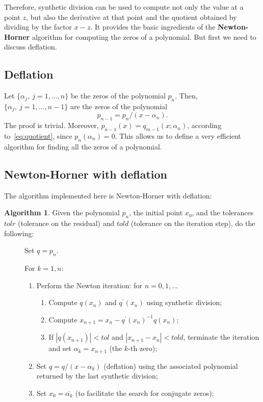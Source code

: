 \documentclass[10pt,a4paper]{article}
\theoremstyle{definition}%
\newtheorem{algo}{Algorithm}
\begin{document}
Therefore, synthetic division can be used to compute not only the value at a point $z$, but also the derivative at that point and the quotient obtained by dividing by the factor $x-z$. It provides the basic ingredients of the \textbf{Newton-Horner} algorithm for computing the zeros of a polynomial. But first we need to discuss deflation.
\subsection{Deflation}
Let $\{\alpha_j,\ j=1,\ldots,n\}$ be the zeros of the polynomial $p_n$. Then, $\{\alpha_j,\ j=1,\ldots,n-1\}$ are the zeros of 
the polynomial
\begin{equation}
p_{n-1}=p_n/(x-\alpha_n).
\end{equation} 
The proof is trivial.
Moreover, $p_{n-1}(x)=q_{m-1}(x;\alpha_n)$, according to~\eqref{eq:quotient}, since $p_n(\alpha_n)=0$. This allows us to define a very efficient algorithm for 
finding all the zeros of a polynomial.
\subsection{Newton-Horner with deflation}
The algorithm implemented here is Newton-Horner with deflation:

\begin{algo}
    Given the polynomial $p_n$, the initial point $x_0$, and the tolerances $tolr$ (tolerance on the residual) and $told$
    (tolerance on the iteration step),
    do the following:
    \begin{description}
        \item[] Set $q=p_n$.
        \item[] For $k=1,n$:
        \begin{enumerate}
            \item Perform the Newton iteration: for $n=0,1,\ldots$
            \begin{enumerate}
                \item Compute $q(x_n)$ and $q^\prime(x_n)$ using synthetic division;
                \item Compute $x_{n+1}=x_{n}-q^\prime(x_{n})^{-1}q(x_n)$;
                \item If $|q(x_{n+1})|<tol$ and $|x_{n+1}-x_{n}|<told$, terminate the iteration and set
            $\alpha_k=x_{n+1}$ (the $k$-th zero);
            \end{enumerate}
            \item Set $q=q/(x-\alpha_k)$ (deflation) using the associated polynomial returned by the last synthetic division;
            \item Set $x_0=\overline{\alpha_k}$ (to facilitate the search for conjugate zeros);
        \end{enumerate}
    \end{description}
\end{algo}
\end{document}
